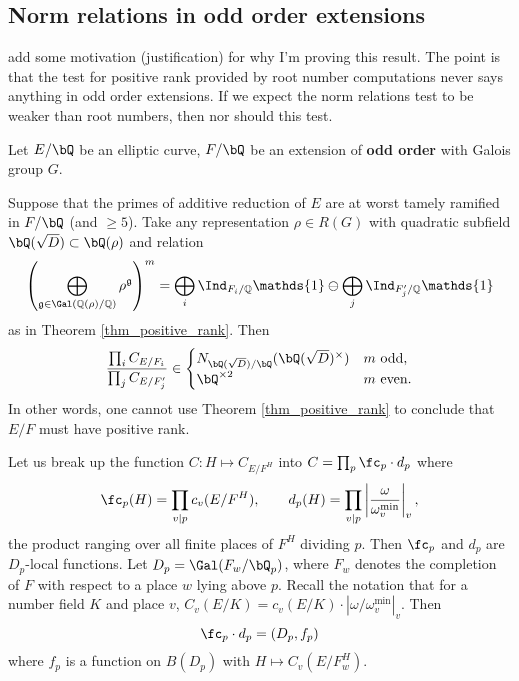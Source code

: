 \subsection{Norm relations in odd order extensions}

{\color{red} add some motivation (justification) for why I'm proving this result. The point is that the test for positive rank provided by root number computations never says anything in odd order extensions. If we expect the norm relations test to be weaker than root numbers, then nor should this test.}

\begin{thm}\label{odd-exts}
 Let $E / \bQ$ be an elliptic curve, $F / \bQ$ be an extension of \textbf{odd order} with Galois group $G$. 
 
Suppose that the primes of additive reduction of $E$ are at worst tamely ramified in $F / \bQ$ (and $\geq 5$). 
Take any representation $\rho \in R(G)$ with quadratic subfield $\bQ(\sqrt{D}) \subset \bQ(\rho)$ and relation
\begin{equation*}\label{odd-exp}
 \left(\bigoplus_{\mathfrak{g}\in\Gal(\QQ(\rho)/\QQ)}\rho^{\mathfrak{g}}\right)^m=\bigoplus_i\Ind_{F_i/\QQ}\mathds{1}\ominus\bigoplus_j\Ind_{F'_j/\QQ}\mathds{1}
\end{equation*}
 as in Theorem \ref{thm_positive_rank}. Then
 \[ \frac{\prod_i C_{E/F_i}}{\prod_j C_{E/F_j'}}  \in 
    \begin{cases}
        N_{\bQ(\sqrt{D}) / \bQ}(\bQ(\sqrt{D})^{\times}) & m \ \text{odd}, \\
        \bQ^{\times 2} & m \ \text{even}.
    \end{cases} \] 
    In other words, one cannot use Theorem \ref{thm_positive_rank} to conclude that $E / F$ must have positive rank. 
\end{thm}
Let us break up the function $C \colon H \mapsto C_{E / F^H}$ into $C = \prod_p  \fc_p \cdot d_p$ where
\begin{equation}\label{c-and-d}
         \fc_p(H) = \prod_{v | p}  c_v(E / F^H) , \qquad d_p(H) = \prod_{v | p} \left|\frac{\omega}{\omega_{v}^{\min}}\right|_v, 
\end{equation}
the product ranging over all finite places of $F^H$ dividing $p$.
Then $\fc_p$ and $d_p$ are $D_p$-local functions. Let $D_p = \Gal(F_w / \bQ_p)$, where $F_w$ denotes the completion of $F$ with respect to a place $w$ lying above $p$. Recall the notation that for a number field $K$ and place $v$, $C_v(E / K) = c_v(E / K) \cdot \left| \omega / \omega_v^{\min} \right|_v.$ 
Then
\begin{equation}\label{Dp-loc}
\fc_p \cdot d_p = (D_p, f_p)
\end{equation}
where $f_p$ is a function on $B(D_p)$ with $H \mapsto C_v(E / F_w^H)$.


